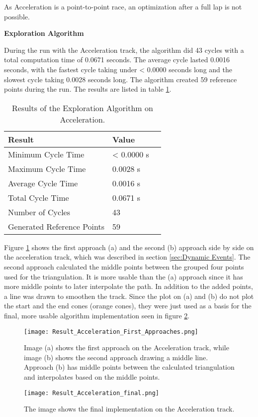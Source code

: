 As Acceleration is a point-to-point race, an optimization after a full lap is not possible.

\textbf{Exploration Algorithm}

During the run with the Acceleration track, the algorithm did 43 cycles with a total computation time of 0.0671 seconds. The average cycle lasted 0.0016 seconds, with the fastest cycle taking under < 0.0000 seconds long and the slowest cycle taking 0.0028 seconds long. The algorithm created 59 reference points during the run. The results are listed in table \ref{tab:Results Acceleration Exploration}.

\begin{table}[H]
    \centering
    \begin{tabular}{|l|l|l|}
        \hline
        \textbf{Result}            & \textbf{Value} \\ \hline
        Minimum Cycle Time         & < 0.0000 s     \\ \hline
        Maximum Cycle Time         & 0.0028 s       \\ \hline
        Average Cycle  Time        & 0.0016 s       \\ \hline
        Total Cycle Time           & 0.0671 s       \\ \hline
        Number of Cycles           & 43             \\ \hline
        Generated Reference Points & 59             \\ \hline
    \end{tabular}
    \caption{Results of the Exploration Algorithm on Acceleration.}
    \label{tab:Results Acceleration Exploration}
\end{table}

Figure \ref{fig:Result Acceleration First Approaches} shows the first approach (a) and the second (b) approach side by side on the acceleration track, which was described in section \ref{sec:Dynamic Events}. The second approach calculated the middle points between the grouped four points used for the triangulation. It is more usable than the (a) approach since it has more middle points to later interpolate the path. In addition to the added points, a line was drawn to smoothen the track. Since the plot on (a) and (b) do not plot the start and the end cones (orange cones), they were just used as a basis for the final, more usable algorithm implementation seen in figure \ref{fig:Result Acceleration Final}.
\begin{figure}[H]
    \centering
    \texttt{[image: Result\_Acceleration\_First\_Approaches.png]}
    \caption{Image (a) shows the first approach on the Acceleration track, while image (b) shows the second approach drawing a middle line. Approach (b) has middle points between the calculated triangulation and interpolates based on the middle points.}
    \label{fig:Result Acceleration First Approaches}
\end{figure}
\begin{figure}[H]
    \centering
    \texttt{[image: Result\_Acceleration\_final.png]}
    \caption{The image shows the final implementation on the Acceleration track.}
    \label{fig:Result Acceleration Final}
\end{figure}

